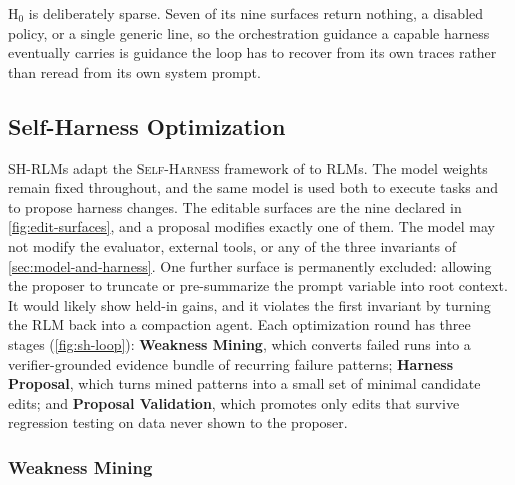 \documentclass{article}
\newcommand{\SC}[1]{\textcolor{violet}{Simon: #1}}
\newcommand{\rlm}{\textsc{RLM}\xspace}
\newcommand{\rlms}{\textsc{RLM}s\xspace}
\newcommand{\sh}{\textsc{Self-Harness}\xspace}
\newcommand{\hzero}{\ensuremath{\mathrm{H}_{0}}\xspace}
\begin{document}
\hzero{} is deliberately sparse. Seven of its nine surfaces return nothing, a disabled policy, or a single generic line, so the orchestration guidance a capable harness eventually carries is guidance the loop has to recover from its own traces rather than reread from its own system prompt.




\subsection{Self-Harness Optimization}
\label{sec:sho}




SH-RLMs adapt the \sh{} framework of \citet{zhang2026selfharness} to \rlms. The model weights remain fixed throughout, and the same model is used both to execute tasks and to propose harness changes. The editable surfaces are the nine declared in \cref{fig:edit-surfaces}, and a proposal modifies exactly one of them. The model may not modify the evaluator, external tools, or any of the three invariants of \cref{sec:model-and-harness}. One further surface is permanently excluded: allowing the proposer to truncate or pre-summarize the prompt variable into root context. It would likely show held-in gains, and it violates the first invariant by turning the \rlm{} back into a compaction agent. Each optimization round has three stages (\cref{fig:sh-loop}): \textbf{Weakness Mining}, which converts failed runs into a verifier-grounded evidence bundle of recurring failure patterns; \textbf{Harness Proposal}, which turns mined patterns into a small set of minimal candidate edits; and \textbf{Proposal Validation}, which promotes only edits that survive regression testing on data never shown to the proposer.

\subsubsection{Weakness Mining}
\label{sec:weakness-mining}
\end{document}
